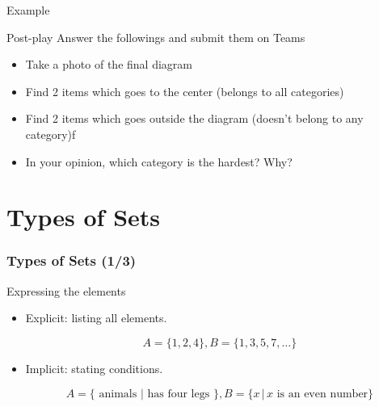 \begin{frame}{Example}
\begin{figure}[h!]
\centering
{}
\end{figure}
\end{frame}

\begin{frame}{}
\begin{exercisebox}{Post-play}{}
Answer the followings and submit them on Teams
\begin{itemize}
\item Take a photo of the final diagram
\item Find 2 items which goes to the center (belongs to all categories)
\item Find 2 items which goes outside the diagram (doesn't belong to any category)f
\item In your opinion, which category is the hardest? Why?
\end{itemize}
\end{exercisebox}
\end{frame}



\section{Types of Sets}
\frame{\sectionpage}

\begin{frame}[t]
\frametitle{Types of Sets (1/3)}
Expressing the elements 
\begin{slide}
\begin{itemize}

\item Explicit: listing all elements. 

\[A = \{1,2,4\} , B = \{1,3,5,7,\ldots\}\] 
\item Implicit: stating conditions. 

\[A = \{ \text{ animals } | \text{ has four legs } \} , B = \{x \, | \, x \text{ is an even number} \}\]
\end{itemize}
\end{slide}
\end{frame}

